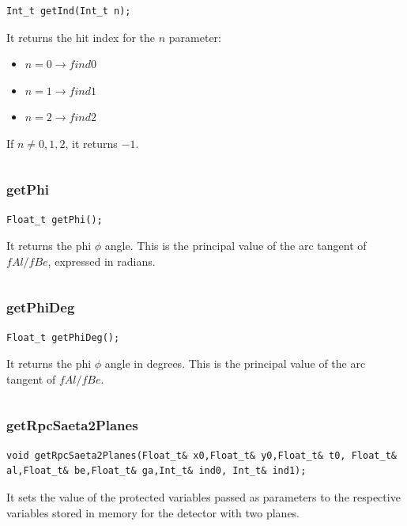 \documentclass[a4paper]{book}
\begin{document}
\begin{lstlisting}[style=customc]
Int_t getInd(Int_t n);
\end{lstlisting}

It returns the hit index for the $n$ parameter:
\begin{itemize}
	\item $n = 0 \rightarrow find0$
	\item $n = 1 \rightarrow find1$
	\item $n = 2 \rightarrow find2$
\end{itemize}

If $n \neq 0, 1, 2$, it returns $-1$.

\[\]

\subsubsection{getPhi}

\begin{lstlisting}[style=customc]
Float_t getPhi();
\end{lstlisting}

It returns the phi $\phi$ angle. This is the principal value of the arc tangent of $fAl/fBe$, expressed in radians.

\[\]

\subsubsection{getPhiDeg}

\begin{lstlisting}[style=customc]
Float_t getPhiDeg();
\end{lstlisting}

It returns the phi $\phi$ angle in degrees. This is the principal value of the arc tangent of $fAl/fBe$.

\[\]

\subsubsection{getRpcSaeta2Planes}

\begin{lstlisting}[style=customc]
void getRpcSaeta2Planes(Float_t& x0,Float_t& y0,Float_t& t0, Float_t& al,Float_t& be,Float_t& ga,Int_t& ind0, Int_t& ind1);
\end{lstlisting}

It sets the value of the protected variables passed as parameters to the respective variables stored in memory for the detector with two planes.
\end{document}
